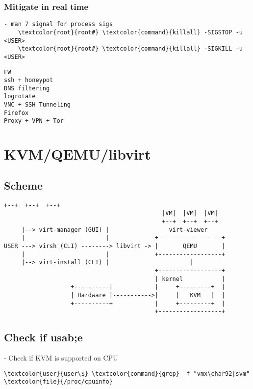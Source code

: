 \documentclass[10pt, a4paper, onecolumn, openany]{book} %
\begin{document}
\subsection{Mitigate in real time}
\begin{Verbatim}[commandchars=\\\{\}]
- man 7 signal for process sigs
    \textcolor{root}{root#} \textcolor{command}{killall} -SIGSTOP -u <USER>
    \textcolor{root}{root#} \textcolor{command}{killall} -SIGKILL -u <USER>
\end{Verbatim}

\begin{Verbatim}[commandchars=\\\{\}]
FW
ssh + honeypot
DNS filtering
logrotate
VNC + SSH Tunneling
Firefox
Proxy + VPN + Tor
\end{Verbatim}



\chapter{KVM/QEMU/libvirt}
\section{Scheme}
\begin{Verbatim}[commandchars=\\\{\}]
                                             +--+  +--+  +--+
                                             |VM|  |VM|  |VM|
                                             +--+  +--+  +--+
     |--> virt-manager (GUI) |                 virt-viewer
     |                       |             +------------------+
USER ---> virsh (CLI) --------> libvirt -> |       QEMU       |
     |                       |             +------------------+
     |--> virt-install (CLI) |                       |
                                           +------------------+
                                           | kernel           |
                   +----------|            |     +---------+  |
                   | Hardware |----------->|     |   KVM   |  |
                   +----------+            |     +---------+  |
                                           +------------------+
\end{Verbatim}
\section{Check if usab;e}
- Check if KVM is supported on CPU
\begin{Verbatim}[commandchars=\\\{\}]
    \textcolor{user}{user\$} \textcolor{command}{grep} -f "vmx\char92|svm" \textcolor{file}{/proc/cpuinfo}
\end{Verbatim}
\end{document}
